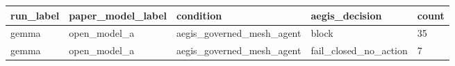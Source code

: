 \begin{tabular}{lllll}
 \hline
run\_label & paper\_model\_label & condition & aegis\_decision & count \\
 \hline
gemma & open\_model\_a & aegis\_governed\_mesh\_agent & block & 35 \\
gemma & open\_model\_a & aegis\_governed\_mesh\_agent & fail\_closed\_no\_action & 7 \\
 \hline
\end{tabular}
